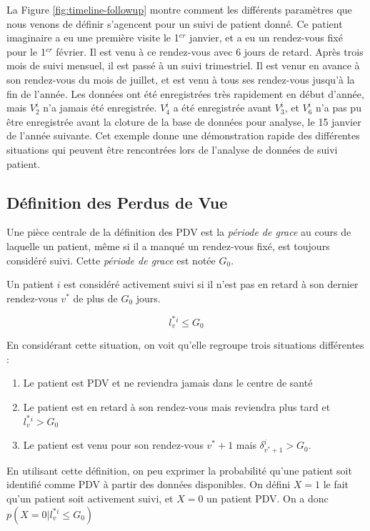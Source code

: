 \documentclass[paper=a4, fontsize=11pt]{scrartcl}
\numberwithin{equation}{section}		%
\numberwithin{figure}{section}			%
\numberwithin{table}{section}				%
\begin{document}
La Figure \ref{fig:timeline-followup} montre comment les différents paramètres que nous venons de définir s'agencent pour un suivi de patient donné. Ce patient imaginaire a eu une première visite le 1$^{er}$ janvier, et a eu un rendez-vous fixé pour le 1$^{er}$ février. Il est venu à ce rendez-vous avec 6 jours de retard. Après trois mois de suivi mensuel, il est passé à un suivi trimestriel. Il est venur en avance à son rendez-vous du mois de juillet, et est venu à tous ses rendez-vous jusqu'à la fin de l'année. Les données ont été enregistrées très rapidement en début d'année, mais $V_2^i$ n'a jamais été enregistrée. $V_4^i$ a été enregistrée avant $V_3^i$, et $V_6^i$ n'a pas pu être enregistrée avant la cloture de la base de données pour analyse, le 15 janvier de l'année suivante. Cet exemple donne une démonstration rapide des différentes situations qui peuvent être rencontrées lors de l'analyse de données de suivi patient.

\subsection{Définition des Perdus de Vue}

Une pièce centrale de la définition des PDV est la \textit{période de grace} au cours de laquelle un patient, même si il a manqué un rendez-vous fixé, est toujours considéré suivi. Cette \textit{période de grace} est notée $G_0$.

Un patient $i$ est considéré activement suivi si il n'est pas en retard à son dernier rendez-vous $v^*$ de plus de  $G_0$  jours.

$$l_v^{*}^i \leq  G_0$$

En considérant cette situation, on voit qu'elle regroupe trois situations différentes :
\begin{enumerate}
\item Le patient est PDV et ne reviendra jamais dans le centre de santé
\item Le patient est en retard à son rendez-vous mais reviendra plus tard et $l_v^{*}^i > G_0$
\item Le patient est venu pour son rendez-vous $v^{*} + 1$ mais $\delta_{v^*+1}^i > G_0$.
\end{enumerate}

En utilisant cette définition, on peu exprimer la probabilité qu'une patient soit identifié comme PDV à partir des données disponibles. On défini  $X = 1$ le fait qu'un patient soit activement suivi, et  $X = 0$ un patient PDV. On a donc $p(X = 0 | l_v^{*}^i \leq  G_0)$
\end{document}

